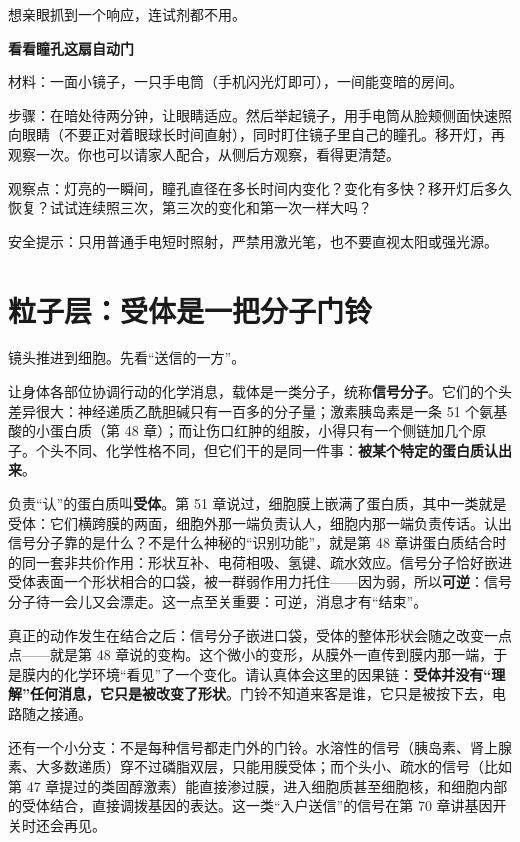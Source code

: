 想亲眼抓到一个响应，连试剂都不用。

\begin{shiyan}
\textbf{看看瞳孔这扇自动门}

材料：一面小镜子，一只手电筒（手机闪光灯即可），一间能变暗的房间。

步骤：在暗处待两分钟，让眼睛适应。然后举起镜子，用手电筒从脸颊侧面快速照向眼睛（不要正对着眼球长时间直射），同时盯住镜子里自己的瞳孔。移开灯，再观察一次。你也可以请家人配合，从侧后方观察，看得更清楚。

观察点：灯亮的一瞬间，瞳孔直径在多长时间内变化？变化有多快？移开灯后多久恢复？试试连续照三次，第三次的变化和第一次一样大吗？

安全提示：只用普通手电短时照射，严禁用激光笔，也不要直视太阳或强光源。
\end{shiyan}

\section{粒子层：受体是一把分子门铃}

镜头推进到细胞。先看“送信的一方”。

让身体各部位协调行动的化学消息，载体是一类分子，统称\textbf{信号分子}。它们的个头差异很大：神经递质乙酰胆碱只有一百多的分子量；激素胰岛素是一条 51 个氨基酸的小蛋白质（第 48 章）；而让伤口红肿的组胺，小得只有一个侧链加几个原子。个头不同、化学性格不同，但它们干的是同一件事：\textbf{被某个特定的蛋白质认出来}。

负责“认”的蛋白质叫\textbf{受体}。第 51 章说过，细胞膜上嵌满了蛋白质，其中一类就是受体：它们横跨膜的两面，细胞外那一端负责认人，细胞内那一端负责传话。认出信号分子靠的是什么？不是什么神秘的“识别功能”，就是第 48 章讲蛋白质结合时的同一套非共价作用：形状互补、电荷相吸、氢键、疏水效应。信号分子恰好嵌进受体表面一个形状相合的口袋，被一群弱作用力托住——因为弱，所以\textbf{可逆}：信号分子待一会儿又会漂走。这一点至关重要：可逆，消息才有“结束”。

真正的动作发生在结合之后：信号分子嵌进口袋，受体的整体形状会随之改变一点点——就是第 48 章说的变构。这个微小的变形，从膜外一直传到膜内那一端，于是膜内的化学环境“看见”了一个变化。请认真体会这里的因果链：\textbf{受体并没有“理解”任何消息，它只是被改变了形状}。门铃不知道来客是谁，它只是被按下去，电路随之接通。

还有一个小分支：不是每种信号都走门外的门铃。水溶性的信号（胰岛素、肾上腺素、大多数递质）穿不过磷脂双层，只能用膜受体；而个头小、疏水的信号（比如第 47 章提过的类固醇激素）能直接渗过膜，进入细胞质甚至细胞核，和细胞内部的受体结合，直接调拨基因的表达。这一类“入户送信”的信号在第 70 章讲基因开关时还会再见。

